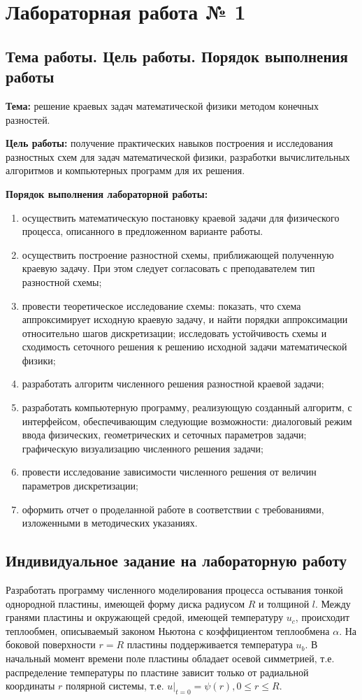 \documentclass[a4paper,14pt,russian, fleqn]{extreport}
\begin{document}
	
	\tableofcontents
	
	\chapter{Лабораторная работа № 1}
	\section{Тема работы. Цель работы. Порядок выполнения работы}
	\textbf{Тема:} решение краевых задач математической физики методом конечных разностей.
	
	\textbf{Цель работы:} получение практических навыков построения и исследования разностных схем для задач математической физики, разработки вычислительных алгоритмов и компьютерных программ для их решения.
	
	\textbf{Порядок выполнения лабораторной работы:}
	\begin{enumerate}
		\item осуществить математическую постановку краевой задачи для физического процесса, описанного в предложенном варианте работы.
		\item осуществить построение разностной схемы, приближающей полученную краевую задачу. При этом следует согласовать с преподавателем тип разностной схемы;
		\item провести теоретическое исследование схемы: показать, что схема аппроксимирует исходную краевую задачу, и найти порядки аппроксимации относительно шагов дискретизации; исследовать устойчивость схемы и сходимость сеточного решения к решению исходной задачи математической физики;
		\item разработать алгоритм численного решения разностной краевой задачи;
		\item разработать компьютерную программу, реализующую созданный алгоритм, с интерфейсом, обеспечивающим следующие возможности: диалоговый режим ввода физических, геометрических и сеточных параметров задачи; графическую визуализацию численного решения задачи;
		\item провести исследование зависимости численного решения от величин параметров дискретизации;
		\item оформить отчет о проделанной работе в соответствии с требованиями, изложенными в методических указаниях.
	\end{enumerate}
	
	\section{Индивидуальное задание на лабораторную работу}	
	Разработать программу численного моделирования процесса остывания тонкой однородной пластины, имеющей форму диска радиусом $R$ и толщиной $l$. Между гранями пластины и окружающей средой, имеющей температуру $u_c$, происходит теплообмен, описываемый законом Ньютона с коэффициентом теплообмена $\alpha$.  На боковой поверхности $r=R$ пластины поддерживается температура $u_b$. В начальный момент времени поле пластины обладает осевой симметрией, т.е. распределение температуры по пластине зависит только от радиальной координаты $r$ полярной системы, т.е. $u\lvert_{t=0} = \psi(r), 0 \leq r \leq R$.
	
\end{document}
